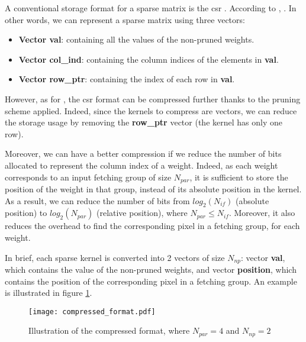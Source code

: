 A conventional storage format for a sparse matrix is the \acrfull{csr} \cite{buluc_parallel_2009}. According to \textcite{buluc_parallel_2009}, . In other words, we can represent a sparse matrix using three vectors:
%
\begin{itemize}
    \item \textbf{Vector val}: containing all the values of the non-pruned weights.
    \item \textbf{Vector col\_ind}: containing the column indices of the elements in \textbf{val}.
    \item \textbf{Vector row\_ptr}: containing the index of each row in \textbf{val}.
\end{itemize}
%
However, as for \cite{zhu_efficient_2020}, the \acrshort{csr} format can be compressed further thanks to the pruning scheme applied. Indeed, since the kernels to compress are vectors, we can reduce the storage usage by removing the \textbf{row\_ptr} vector (the kernel has only one row). 

Moreover, we can have a better compression if we reduce the number of bits allocated to represent the column index of a weight. Indeed, as each weight corresponds to an input fetching group of size $N_{par}$, it is sufficient to store the position of the weight in that group, instead of its absolute position in the kernel. As a result, we can reduce the number of bits from $log_2(N_{if})$ (absolute position) to $log_2(N_{par})$ (relative position), where $N_{par} \leq N_{if}$. Moreover, it also reduces the overhead to find the corresponding pixel in a fetching group, for each weight.

In brief, each sparse kernel is converted into 2 vectors of size $N_{np}$: vector \textbf{val}, which contains the value of the non-pruned weights, and vector \textbf{position}, which contains the position of the corresponding pixel in a fetching group. An example is illustrated in figure \ref{fig:compressed_format}.
%
\begin{figure}[H]
    \centering
    \texttt{[image: compressed\_format.pdf]}
    \caption{Illustration of the compressed format, where $N_{par} = 4$ and $N_{np} = 2$}
    \label{fig:compressed_format}
\end{figure}


